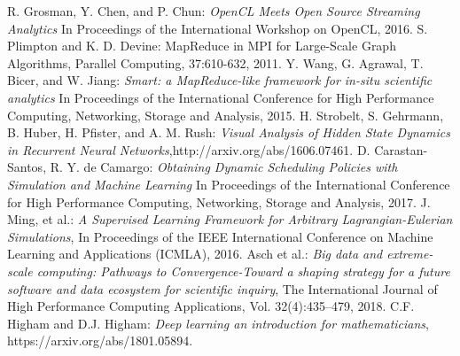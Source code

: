 \begin{thebibliography}{0}
R. Grosman, Y. Chen, and P. Chun:
\textsl{OpenCL Meets Open Source Streaming Analytics}
In Proceedings of the International Workshop on OpenCL, 2016.
%
S. Plimpton and K. D. Devine: 
{MapReduce in MPI for Large-Scale Graph Algorithms}, 
Parallel Computing, 37:610-632, 2011.
%
Y. Wang, G. Agrawal, T. Bicer, and W. Jiang: 
\textsl{Smart: a MapReduce-like framework for in-situ scientific analytics}
In Proceedings of the International Conference for High Performance Computing, Networking, Storage and Analysis, 2015.
%
H. Strobelt, S. Gehrmann, B. Huber, H. Pfister, and A. M. Rush:
\textsl{Visual Analysis of Hidden State Dynamics in Recurrent Neural Networks},http://arxiv.org/abs/1606.07461.
%
D. Carastan-Santos, R. Y. de Camargo:
\textsl{Obtaining Dynamic Scheduling Policies with Simulation and Machine Learning}
In Proceedings of the International Conference for High Performance Computing, Networking, Storage and Analysis, 2017.
%
J. Ming, et al.:
\textsl{A Supervised Learning Framework for Arbitrary Lagrangian-Eulerian Simulations},
In Proceedings of the IEEE International Conference on Machine Learning and Applications (ICMLA), 2016.
%
Asch et al.: 
\textsl{Big data and extreme-scale computing: Pathways to Convergence-Toward a shaping strategy for a future software and data ecosystem for scientific inquiry},
The International Journal of High Performance Computing Applications, Vol. 32(4):435–479, 2018.
%
C.F. Higham and D.J. Higham:
\textsl{Deep learning an introduction for mathematicians}, https://arxiv.org/abs/1801.05894.
\end{thebibliography}


